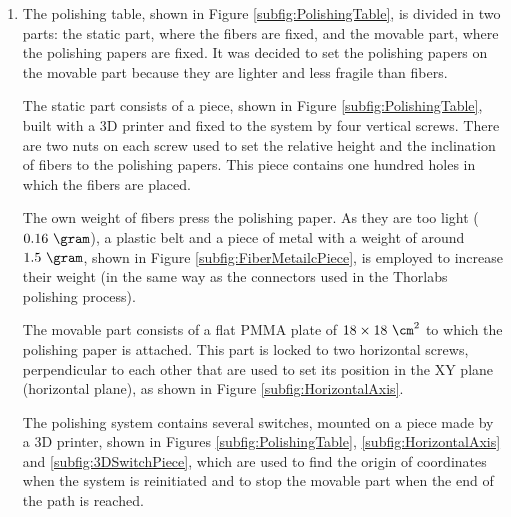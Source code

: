 \begin{enumerate}
\item{} The polishing table, shown in Figure \ref{subfig:PolishingTable}, is divided in two parts: the static part, where the fibers are fixed, and the movable part, where the polishing papers are fixed. It was decided to set the polishing papers on the movable part because they are lighter and less fragile than fibers.

The static part consists of a piece, shown in Figure \ref{subfig:PolishingTable}, built with a 3D printer and fixed to the system by four vertical screws. There are two nuts on each screw used to set the relative height and the inclination of fibers to the polishing papers. This piece contains one hundred holes in which the fibers are placed. 

The own weight of fibers press the polishing paper. As they are too light ($0.16~\gram$), a plastic belt and a piece of metal with a weight of around $1.5~\gram$, shown in Figure \ref{subfig:FiberMetailcPiece}, is employed to increase their weight (in the same way as the connectors used in the Thorlabs polishing process).

The movable part consists of a flat PMMA plate of $18 \times 18~\cm^2$ to which the polishing paper is attached. This part is locked to two horizontal screws, perpendicular to each other that are used to set its position in the XY plane (horizontal plane), as shown in Figure \ref{subfig:HorizontalAxis}.

The polishing system contains several switches,  mounted on a piece made by a 3D printer, shown in Figures \ref{subfig:PolishingTable}, \ref{subfig:HorizontalAxis} and \ref{subfig:3DSwitchPiece}, which are used to find the origin of coordinates when the system is reinitiated and to stop the movable part when the end of the path is reached. 


\end{enumerate}
